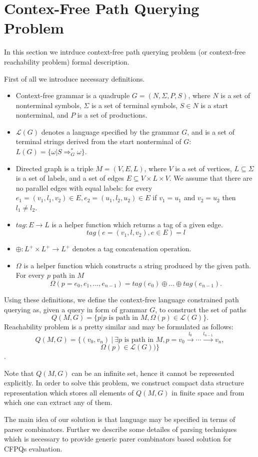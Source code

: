 \section{Contex-Free Path Querying Problem}

In this section we intrduce context-free path querying problem (or context-free reachability problem) formal description.

First of all we introduce necessary definitions.
\begin{itemize}
  \item Context-free grammar is a quadruple $G=(N, \Sigma, P, S)$, where $N$ is a set of nonterminal symbols, $\Sigma$ is a set of terminal symbols, $S \in N$ is a start nonterminal, and $P$ is a set of productions. 
  \item $\mathcal{L}(G)$ denotes a language specified by the grammar $G$, and is a set of terminal strings derived from the start nonterminal of $G$: $L(G) = \{\omega | S \Rightarrow_{G}^{*} \omega\}$.
  \item Directed graph is a triple $M = (V,E,L)$, where $V$ is a set of vertices, $L \subseteq \Sigma$ is a set of labels, and a set of edges $E\subseteq V\times L\times V$. 
  We assume that there are no parallel edges with equal labels: for every $e_1=(v_1,l_1,v_2) \in E, e_2=(u_1,l_2,u_2) \in E$ if $v_1 = u_1$ and $v_2 = u_2$ then $l_1 \neq l_2$.
  \item $tag: E \rightarrow L$ is a helper function which returns a tag of a given edge. $$tag(e = (v_1,l,v_2), e \in E) = l$$
  \item $\oplus: L^+ \times L^+ \rightarrow L^+$ denotes a tag concatenation operation.
  \item $\Omega$ is a helper function which constructs a string produced by the given path. For every $p \text{ path in } M$
  $$ \Omega(p = e_{0},e_{1},\dots,e_{n-1}) = tag (e_{0}) \oplus \dots \oplus tag (e_{n-1}).$$
\end{itemize}

Using these definitions, we define the context-free language constrained path querying as, given a query in form of grammar $G$, to construct the set of paths $$Q(M,G)=\{p|p \text{ is path in } M, \Omega(p) \in \mathcal{L}(G)\}.$$
Reachability problem is a pretty similar and may be formulated as follows: $$Q(M,G) =\{ (v_0,v_n) \ | \ \exists p \text{ is path in } M, p = v_0 \xrightarrow{l_0} \cdots \xrightarrow{l_{n-1}}v_n,$$
$$ \Omega(p) \in   \mathcal{L}(G))\}$$.

Note that $Q(M, G)$ can be an infinite set, hence it cannot be represented explicitly. 
In order to solve this problem, we construct compact data structure representation which stores all elements of $Q(M,G)$ in finite space and from which one can extract any of them.

The main idea of our solution is that language may be specified in terms of parser combinators.
Further we describe some detailes of parsing techniques which is necessary to provide generic parer combinators based solution for CFPQs evaluation.
